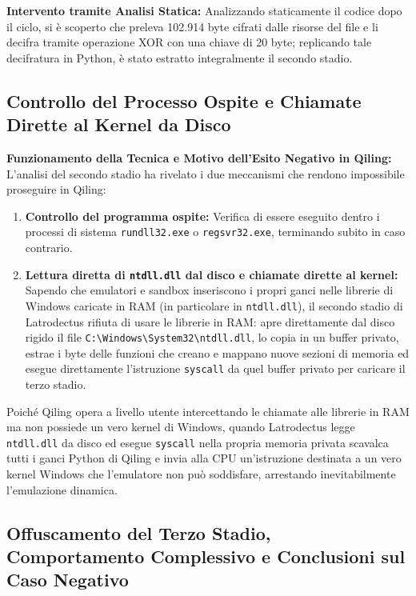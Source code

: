 \documentclass[11pt, a4paper]{article}
\begin{document}
	\textbf{Intervento tramite Analisi Statica:} Analizzando staticamente il codice dopo il ciclo, si è scoperto che preleva 102.914 byte cifrati dalle risorse del file e li decifra tramite operazione XOR con una chiave di 20 byte; replicando tale decifratura in Python, è stato estratto integralmente il secondo stadio.
	
	\subsection{Controllo del Processo Ospite e Chiamate Dirette al Kernel da Disco}
	
	\textbf{Funzionamento della Tecnica e Motivo dell'Esito Negativo in Qiling:} L'analisi del secondo stadio ha rivelato i due meccanismi che rendono impossibile proseguire in Qiling:
	
	\begin{enumerate}
		\item \textbf{Controllo del programma ospite:} Verifica di essere eseguito dentro i processi di sistema \texttt{rundll32.exe} o \texttt{regsvr32.exe}, terminando subito in caso contrario.
		\item \textbf{Lettura diretta di \texttt{ntdll.dll} dal disco e chiamate dirette al kernel:} Sapendo che emulatori e sandbox inseriscono i propri ganci nelle librerie di Windows caricate in RAM (in particolare in \texttt{ntdll.dll}), il secondo stadio di Latrodectus rifiuta di usare le librerie in RAM: apre direttamente dal disco rigido il file \texttt{C:\textbackslash Windows\textbackslash System32\textbackslash ntdll.dll}, lo copia in un buffer privato, estrae i byte delle funzioni che creano e mappano nuove sezioni di memoria ed esegue direttamente l'istruzione \texttt{syscall} da quel buffer privato per caricare il terzo stadio.
	\end{enumerate}
	
	Poiché Qiling opera a livello utente intercettando le chiamate alle librerie in RAM ma non possiede un vero kernel di Windows, quando Latrodectus legge \texttt{ntdll.dll} da disco ed esegue \texttt{syscall} nella propria memoria privata scavalca tutti i ganci Python di Qiling e invia alla CPU un'istruzione destinata a un vero kernel Windows che l'emulatore non può soddisfare, arrestando inevitabilmente l'emulazione dinamica.
	
	\subsection{Offuscamento del Terzo Stadio, Comportamento Complessivo e Conclusioni sul Caso Negativo}
	
\end{document}
